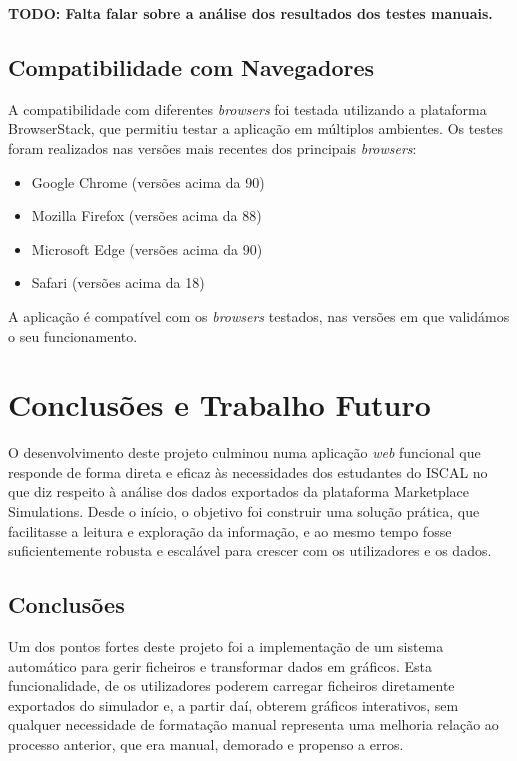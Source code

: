 \textbf{TODO: Falta falar sobre a análise dos resultados dos testes manuais.}

\section{Compatibilidade com Navegadores}

A compatibilidade com diferentes \textit{browsers} foi testada utilizando a plataforma BrowserStack, que permitiu testar a aplicação em múltiplos ambientes. Os testes foram realizados nas versões mais recentes dos principais \textit{browsers}:

\begin{itemize}
    \item Google Chrome (versões acima da 90)
    \item Mozilla Firefox (versões acima da 88)
    \item Microsoft Edge (versões acima da 90)
    \item Safari (versões acima da 18)
\end{itemize}

A aplicação é compatível com os \textit{browsers} testados, nas versões em que validámos o seu funcionamento.

\chapter{Conclusões e Trabalho Futuro}
\label{ch:conclusoesTrabalhoFuturo}

O desenvolvimento deste projeto culminou numa aplicação \textit{web} funcional que responde de forma direta e eficaz às necessidades dos estudantes do ISCAL no que diz respeito à análise dos dados exportados da plataforma Marketplace Simulations. Desde o início, o objetivo foi construir uma solução prática, que facilitasse a leitura e exploração da informação, e ao mesmo tempo fosse suficientemente robusta e escalável para crescer com os utilizadores e os dados.

\section{Conclusões}

Um dos pontos fortes deste projeto foi a implementação de um sistema automático para gerir ficheiros e transformar dados em gráficos. Esta funcionalidade, de os utilizadores poderem carregar ficheiros diretamente exportados do simulador e, a partir daí, obterem gráficos interativos, sem qualquer necessidade de formatação manual representa uma melhoria relação ao processo anterior, que era manual, demorado e propenso a erros. 

